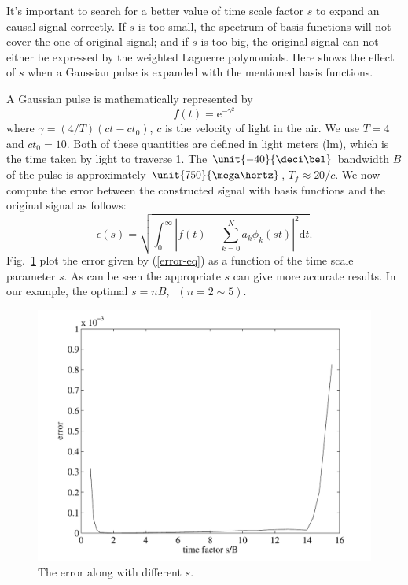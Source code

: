 \documentclass[conference, a4paper]{IEEEtran}
\begin{document}
It's important to search for a better value of time scale factor $s$ to
expand an causal signal correctly. If $s$ is too small, the spectrum of
basis functions will not cover the one of original signal; and if $s$ is
too big, the original signal can not either be expressed by the weighted
Laguerre polynomials. Here shows the effect of $s$ when a Gaussian pulse
is expanded with the mentioned basis functions.

A Gaussian pulse is mathematically represented by
\begin{equation}
f(t)=\mathrm{e}^{-\gamma^2}
\end{equation}
where $\gamma=(4/T)(ct-ct_0)$, $c$ is the velocity of light in the air.
We use $T=4$ and $ct_0=10$. Both of these quantities are defined in
light meters (lm), which is the time taken by light to traverse
\unit{1}{\meter}. The $\unit{-40}{\deci\bel}$ bandwidth $B$ of the pulse
is approximately $\unit{750}{\mega\hertz}$, $T_f\approx 20/c$. We now
compute the error between the constructed signal with basis functions
and the original signal as follows:
\begin{equation}
\epsilon(s)=\sqrt{\int_0^\infty\left | f(t)-\sum_{k=0}^N
a_k\phi_k(st)\right | ^2\mathrm{d}t}.\label{error-eq}
\end{equation}
Fig.~\ref{error} plot the error given by (\ref{error-eq}) as a function of
the time scale parameter $s$. As can be seen the appropriate $s$ can
give more accurate results. In our example, the optimal $s=nB,\;\;(n=2\sim 5)$.
\begin{figure}
    \centering
    \includegraphics[scale=.48]{error.pdf}
    \caption{The error along with different $s$.}
    \label{error}
\end{figure}
\end{document}

